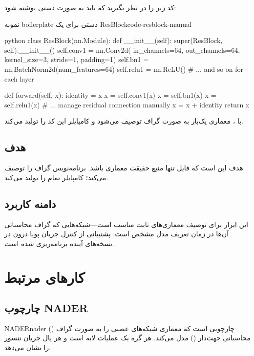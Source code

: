 \documentclass{nngraph-fa}
\begin{document}
کد  زیر را در نظر بگیرید که باید به صورت دستی نوشته شود:

\begin{codebox}{نمونه boilerplate دستی برای یک ResBlock}{code-resblock-manual}
\begin{amzcode}{python}
class ResBlock(nn.Module):
    def __init__(self):
        super(ResBlock, self).__init__()
        self.conv1 = nn.Conv2d(
            in_channels=64, out_channels=64,
            kernel_size=3, stride=1, padding=1)
        self.bn1   = nn.BatchNorm2d(num_features=64)
        self.relu1 = nn.ReLU()
        # ... and so on for each layer

    def forward(self, x):
        identity = x
        x = self.conv1(x)
        x = self.bn1(x)
        x = self.relu1(x)
        # ... manage residual connection manually
        x = x + identity
        return x
\end{amzcode}
\end{codebox}

با ، معماری یک‌بار به صورت گراف توصیف می‌شود و
کامپایلر این کد را تولید می‌کند.

\section{هدف}

هدف  این است که فایل  تنها منبع حقیقت
معماری باشد. برنامه‌نویس گراف را توصیف می‌کند؛ کامپایلر تمام
 را تولید می‌کند.

\section{دامنه کاربرد}

این ابزار برای توصیف معماری‌های ثابت مناسب است---شبکه‌هایی که
گراف محاسباتی آن‌ها در زمان تعریف مدل مشخص است. پشتیبانی از
کنترل جریان پویا درون  در نسخه‌های آینده برنامه‌ریزی
شده است.

\chapter{کارهای مرتبط}

\section{چارچوب NADER}

\begin{dfnbox}{NADER}{nader}
 ()
چارچوبی است که معماری شبکه‌های عصبی را به صورت گراف محاسباتی
جهت‌دار () مدل می‌کند. هر گره یک عملیات لایه است و هر
یال جریان تنسور را نشان می‌دهد.
\end{dfnbox}
\end{document}
